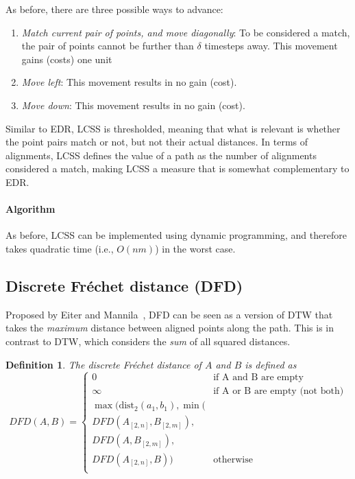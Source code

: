 \documentclass[10pt,letterpaper]{article}
\newcommand{\dist}{\ensuremath{\text{dist}}}
\newtheorem{definition}{Definition}
\begin{document}
As before, there are three possible ways to advance:
\begin{enumerate}
\item \textit{Match current pair of points, and move diagonally}: To be considered a match, the pair of points cannot be further than $\delta$ timesteps away. This movement gains (costs) one unit
\item \textit{Move left}: This movement results in no gain (cost).
\item \textit{Move down}: This movement results in no gain (cost).
\end{enumerate}

Similar to EDR, LCSS is thresholded, meaning that what is relevant is whether the point pairs match or not, but not their actual distances.
In terms of alignments, LCSS defines the value of a path as the number of alignments considered a match, making LCSS a measure that is somewhat complementary to EDR.

\paragraph{Algorithm}
As before, LCSS can be implemented using dynamic programming, and therefore takes quadratic time (i.e., $O(nm)$) in the worst case.

\subsection{Discrete Fréchet distance (DFD)}
Proposed by  Eiter and Mannila~\cite{Wien94computingdiscrete}, DFD can be seen as a version of DTW that takes the \emph{maximum} distance between aligned points along the path. This is in contrast to DTW, which considers the \emph{sum} of all squared distances.

\begin{definition}
The discrete Fr\'echet distance of $A$ and $B$ is defined as
\[
DFD(A,B) =
\left\{
	\begin{array}{ll}
		0  & \mbox{if A and B are empty} \\
		\infty  & \mbox{if A or B are empty (not both)} \\
		\max( \dist_2(a_1,b_1),
		\min( \\
	DFD(A_{[2,n]},B_{[2,m]}), \\
			  DFD(A,B_{[2,m]}),  \\
			DFD(A_{[2,n]},B)) & \mbox{otherwise } \\
		\end{array}
\right.
\]
\end{definition}
\end{document}
